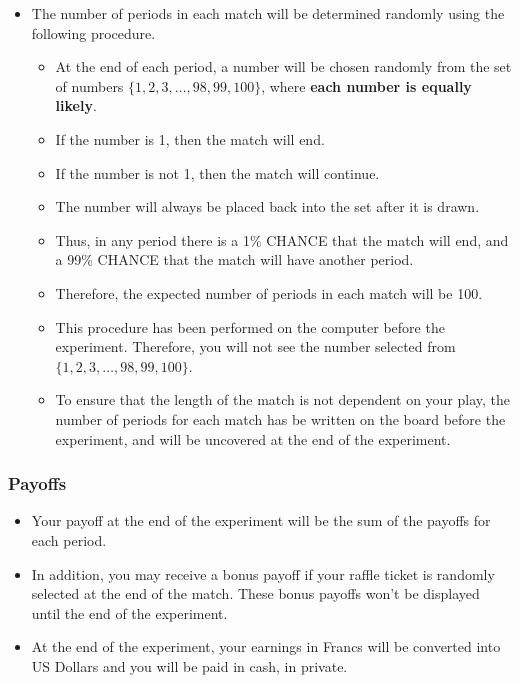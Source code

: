 \documentclass[11pt]{article}
\newcommand{\dblbkt}[1]{}
\begin{document}
\begin{itemize} 
\item The number of periods in each match will be determined randomly using the following procedure.  
\begin{itemize} 
  \item At the end of each period, \dblbkt{1}a number will be chosen randomly from the set of numbers \dblbkt{1} $ \{1,2,3,\ldots, 98, 99, 100\}$, where {\bf each number is equally likely}.  
  \item \dblbkt{1}If the number is 1, then the match will end.
  \item \dblbkt{1}If the number is not 1, then the match will continue.
  \item The number will always be placed back into the set after it is drawn.  
  \item Thus, in any period there is a 1\% CHANCE that the match will end, and a 99\% CHANCE that the match will have another period.
  \item Therefore, \dblbkt{1}the expected number of periods in each match will be 100.
  \item \dblbkt{2}This procedure has been performed on the computer before the experiment. Therefore, you will not see the number selected from $ \{1,2,3,\ldots, 98, 99, 100\}$.
  \item To ensure that the length of the match is not dependent on your play, the number of periods for each match has be written on the board before the experiment, and will be uncovered at the end of the experiment.  
\end{itemize} 
\end{itemize}



\subsubsection*{\dblbkt{3} Payoffs} 

\begin{itemize} 
\item Your payoff at the end of the experiment will be the \dblbkt{1} sum of the payoffs for each period.
\item In addition, you may receive a \dblbkt{1} bonus payoff if your raffle ticket is randomly selected at the end of the match.  These bonus payoffs won't be \dblbkt{1} displayed until the end of the experiment.  
\item At the end of the experiment, \dblbkt{1} your earnings in Francs will be converted into US Dollars and you will be paid in cash, in private.   
\end{itemize} 

\end{document}
